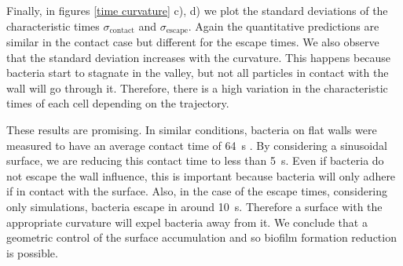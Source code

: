 Finally, in figures \ref{time curvature} c), d) we plot the standard deviations of the characteristic times $\sigma_{\text{contact}}$ and $\sigma_{\text{escape}}$. Again the quantitative predictions are similar in the contact case but different for the escape times. We also observe that the standard deviation increases with the curvature. This happens because bacteria start to stagnate in the valley, but not all particles in contact with the wall will go through it. Therefore, there is a high variation in the characteristic times of each cell depending on the trajectory.


These results are promising. In similar conditions, bacteria on flat walls were measured to have an average contact time of \SI{64}{\second} \cite{Drescher2011FluidScattering}. By considering a sinusoidal surface, we are reducing this contact time to less than \SI{5}{\second}. Even if bacteria do not escape the wall influence, this is important because bacteria will only adhere if in contact with the surface. Also, in the case of the escape times, considering only simulations, bacteria escape in around \SI{10}{\second}. Therefore a surface with the appropriate curvature will expel bacteria away from it. We conclude that a geometric control of the surface accumulation and so biofilm formation reduction is possible.
 

